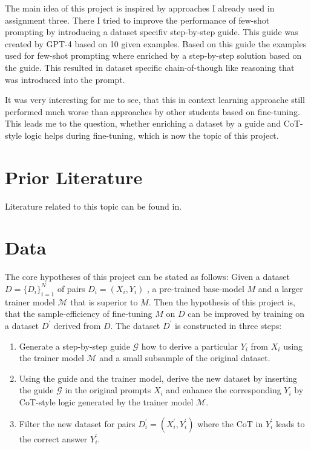 \documentclass[11pt]{article}
\begin{document}
    The main idea of this project is inspired by approaches I already used in assignment three.
    There I tried to improve the performance of few-shot prompting by introducing a dataset specifiv step-by-step guide.
    This guide was created by GPT-4 based on 10 given examples.
    Based on this guide the examples used for few-shot prompting where enriched by a step-by-step solution based on the guide.
    This resulted in dataset specific chain-of-though like reasoning that was introduced into the prompt.

    It was very interesting for me to see, that this in context learning approache still performed much worse than
    approaches by other students based on fine-tuning.
    This leads me to the question, whether enriching a dataset by a guide and CoT-style logic helps during fine-tuning,
    which is now the topic of this project.


    \section{Prior Literature}
    Literature related to this topic can be found in\cite{chen_learning_2023, chen_fireact_2023}.


    \section{Data}

    The core hypotheses of this project can be stated as follows:
    Given a dataset $D = \{D_i\}_{i=1}^N$ of pairs $D_i = (X_i, Y_i)$ , a pre-trained base-model $M$ and
    a larger trainer model $\mathcal{M}$ that is superior to $M$.
    Then the hypothesis of this project is, that the sample-efficiency of fine-tuning $M$ on $D$ can be improved by
    training on a dataset $D^\prime$ derived from $D$.
    The dataset $D^\prime$ is constructed in three steps:
    \begin{enumerate}
        \item Generate a step-by-step guide $\mathcal{G}$ how to derive a particular $Y_i$ from $X_i$ using the trainer model
        $\mathcal{M}$ and a small subsample of the original dataset.
        \item Using the guide and the trainer model, derive the new dataset by inserting the guide $\mathcal{G}$ in the
        original prompts $X_i$ and enhance the corresponding $Y_i$ by CoT-style logic generated by the trainer model $\mathcal{M}$.
        \item Filter the new dataset for pairs $D^\prime_i = (X^\prime_i, Y^\prime_i)$ where the CoT in $Y^\prime_i$
        leads to the correct answer $Y^\prime_i$.
    \end{enumerate}
\end{document}
